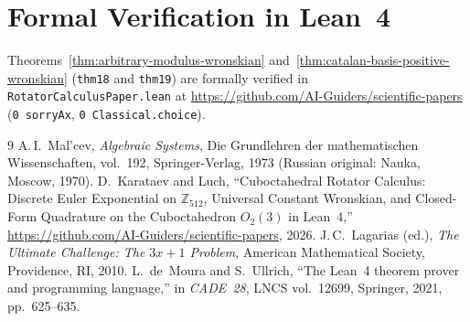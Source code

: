 \documentclass[11pt,a4paper]{article}
\theoremstyle{definition}
\theoremstyle{remark}
\begin{document}
\section{Formal Verification in Lean~4}
Theorems~\ref{thm:arbitrary-modulus-wronskian} and~\ref{thm:catalan-basis-positive-wronskian} (\texttt{thm18} and \texttt{thm19}) are formally verified in \texttt{RotatorCalculusPaper.lean} at \url{https://github.com/AI-Guiders/scientific-papers} (\texttt{0 sorryAx}, \texttt{0 Classical.choice}).

\begin{thebibliography}{9}
A.\,I.~Mal'cev, \emph{Algebraic Systems}, Die Grundlehren der mathematischen Wissenschaften, vol.~192, Springer-Verlag, 1973 (Russian original: Nauka, Moscow, 1970).
D.~Karataev and Luch, ``Cuboctahedral Rotator Calculus: Discrete Euler Exponential on $\mathbb{Z}_{512}$, Universal Constant Wronskian, and Closed-Form Quadrature on the Cuboctahedron $O_2(3)$ in Lean~4,'' \url{https://github.com/AI-Guiders/scientific-papers}, 2026.
J.\,C.~Lagarias (ed.), \emph{The Ultimate Challenge: The $3x+1$ Problem}, American Mathematical Society, Providence, RI, 2010.
L.~de~Moura and S.~Ullrich, ``The Lean~4 theorem prover and programming language,'' in \emph{CADE~28}, LNCS vol.~12699, Springer, 2021, pp.~625--635.
\end{thebibliography}
\end{document}

